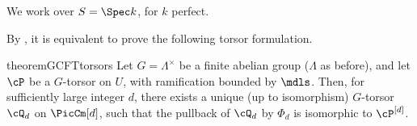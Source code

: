 We work over $S=\Spec k$, for $k$ perfect.

By , it is equivalent to prove the
following torsor formulation.
\begin{restatable}{theorem}{GCFTtorsors} \label{thm:GCFT_torsors}
    Let $G=\Lambda^\times$ be a finite abelian group ($\Lambda$ as before), and let $\cP$ be a $G$-torsor on $U$, with ramification bounded by $\mdls$. 
    Then, for sufficiently large integer $d$, there exists a unique (up to isomorphism) $G$-torsor $\cQ_d$ on $\PicCm[d]$, such that the pullback of $\cQ_d$ by $\Phi_d$ is isomorphic to $\cP^{[d]}$.
\end{restatable}


